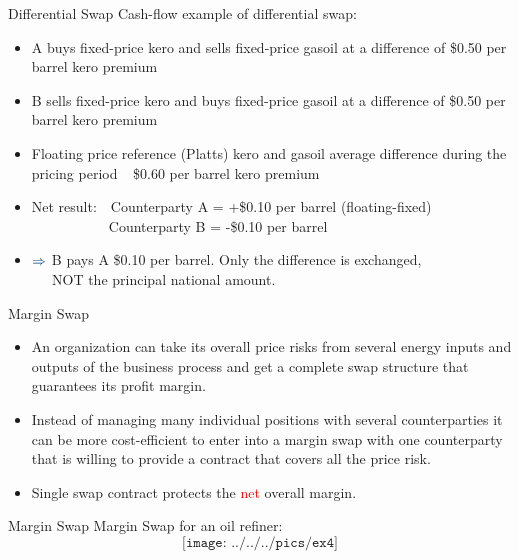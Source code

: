 {Differential Swap}
\textcolor[rgb]{0.00,0.25,0.50}{Cash-flow example of differential swap:}
\begin{itemize}
\item<1->
A buys fixed-price kero and sells fixed-price gasoil at a difference of \$0.50 per barrel kero premium
\item<2-> B sells fixed-price kero and buys fixed-price gasoil at a difference of \$0.50 per barrel kero premium
\item<3-> Floating price reference (Platts) kero and gasoil average difference during the pricing period $\;\,$ \$0.60 per barrel kero premium
\item<4->
\textcolor[rgb]{0.00,0.25,0.50}{Net result:}$\quad$Counterparty A = +\$0.10 per barrel (floating-fixed)\\
$\qquad\qquad\quad\,$  Counterparty B = -\$0.10 per barrel
\item<5->
$\textcolor[rgb]{0.00,0.25,0.50}{\Rightarrow}$ B pays A \$0.10 per barrel. Only the difference is exchanged,\\
$\quad\;\,$NOT the principal national amount.
\end{itemize}




{Margin Swap}
\begin{itemize}
\item<1->
An organization can take its overall price risks from several energy inputs and outputs of the business process and get a complete swap structure that guarantees its profit margin.
\item<2-> Instead of managing many individual positions with several counterparties it can be more cost-efficient to enter into a margin swap with one counterparty that is willing to provide a contract that covers all the price risk.
\item<3-> Single swap contract protects the \textcolor{red}{net} overall margin.
\end{itemize}



{Margin Swap}
Margin Swap for an oil refiner:
$$\texttt{[image: ../../../pics/ex4]}$$




